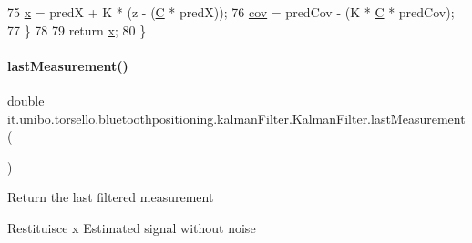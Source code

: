 \begin{DoxyCode}
75             \hyperlink{classit_1_1unibo_1_1torsello_1_1bluetoothpositioning_1_1kalmanFilter_1_1KalmanFilter_acab8f5b6d2cec6daae8c6e5a300243cd_acab8f5b6d2cec6daae8c6e5a300243cd}{x} = predX + K * (z - (\hyperlink{classit_1_1unibo_1_1torsello_1_1bluetoothpositioning_1_1kalmanFilter_1_1KalmanFilter_a0e605eaeec6a8d59254d45a6bbef2a52_a0e605eaeec6a8d59254d45a6bbef2a52}{C} * predX));
76             \hyperlink{classit_1_1unibo_1_1torsello_1_1bluetoothpositioning_1_1kalmanFilter_1_1KalmanFilter_a9446f9ad4fbe8b2665e8109c9a22758e_a9446f9ad4fbe8b2665e8109c9a22758e}{cov} = predCov - (K * \hyperlink{classit_1_1unibo_1_1torsello_1_1bluetoothpositioning_1_1kalmanFilter_1_1KalmanFilter_a0e605eaeec6a8d59254d45a6bbef2a52_a0e605eaeec6a8d59254d45a6bbef2a52}{C} * predCov);
77         \}
78 
79         \textcolor{keywordflow}{return} \hyperlink{classit_1_1unibo_1_1torsello_1_1bluetoothpositioning_1_1kalmanFilter_1_1KalmanFilter_acab8f5b6d2cec6daae8c6e5a300243cd_acab8f5b6d2cec6daae8c6e5a300243cd}{x};
80     \}
\end{DoxyCode}
\hypertarget{classit_1_1unibo_1_1torsello_1_1bluetoothpositioning_1_1kalmanFilter_1_1KalmanFilter_a43184e14be498b5a7fb684f6713a9697_a43184e14be498b5a7fb684f6713a9697}{}\label{classit_1_1unibo_1_1torsello_1_1bluetoothpositioning_1_1kalmanFilter_1_1KalmanFilter_a43184e14be498b5a7fb684f6713a9697_a43184e14be498b5a7fb684f6713a9697} 
\paragraph{\texorpdfstring{last\+Measurement()}{lastMeasurement()}}
{\footnotesize\ttfamily double it.\+unibo.\+torsello.\+bluetoothpositioning.\+kalman\+Filter.\+Kalman\+Filter.\+last\+Measurement (\begin{DoxyParamCaption}{ }\end{DoxyParamCaption})}

Return the last filtered measurement

\begin{DoxyReturn}{Restituisce}
x Estimated signal without noise 
\end{DoxyReturn}

